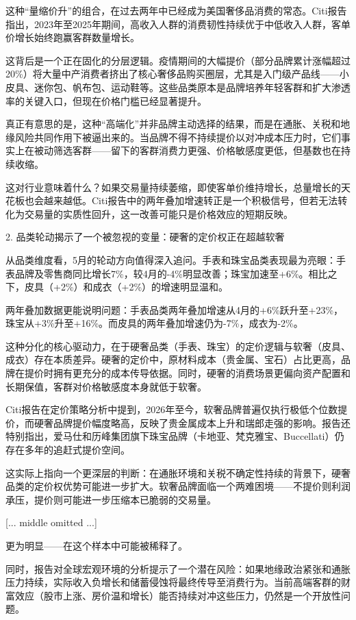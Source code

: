\documentclass[11pt]{ctexart}
\begin{document}
这种“量缩价升”的组合，在过去两年中已经成为美国奢侈品消费的常态。Citi报告指出，2023年至2025年期间，高收入人群的消费韧性持续优于中低收入人群，客单价增长始终跑赢客群数量增长。

这背后是一个正在固化的分层逻辑。疫情期间的大幅提价（部分品牌累计涨幅超过20\%）将大量中产消费者挤出了核心奢侈品购买圈层，尤其是入门级产品线——小皮具、迷你包、帆布包、运动鞋等。这些品类原本是品牌培养年轻客群和扩大渗透率的关键入口，但现在价格门槛已经显著提升。

真正有意思的是，这种“高端化”并非品牌主动选择的结果，而是在通胀、关税和地缘风险共同作用下被逼出来的。当品牌不得不持续提价以对冲成本压力时，它们事实上在被动筛选客群——留下的客群消费力更强、价格敏感度更低，但基数也在持续收缩。

这对行业意味着什么？如果交易量持续萎缩，即使客单价维持增长，总量增长的天花板也会越来越低。Citi报告中的两年叠加增速转正是一个积极信号，但若无法转化为交易量的实质性回升，这一改善可能只是价格效应的短期反映。

2. 品类轮动揭示了一个被忽视的变量：硬奢的定价权正在超越软奢

从品类维度看，5月的轮动方向值得深入追问。手表和珠宝品类表现最为亮眼：手表品牌及零售商同比增长7\%，较4月的-4\%明显改善；珠宝加速至+6\%。相比之下，皮具（+2\%）和成衣（+2\%）的增速明显温和。

两年叠加数据更能说明问题：手表品类两年叠加增速从4月的+6\%跃升至+23\%，珠宝从+3\%升至+16\%。而皮具的两年叠加增速仍为-7\%，成衣为-2\%。

这种分化的核心驱动力，在于硬奢品类（手表、珠宝）的定价逻辑与软奢（皮具、成衣）存在本质差异。硬奢的定价中，原材料成本（贵金属、宝石）占比更高，品牌在提价时拥有更充分的成本传导依据。同时，硬奢的消费场景更偏向资产配置和长期保值，客群对价格敏感度本身就低于软奢。

Citi报告在定价策略分析中提到，2026年至今，软奢品牌普遍仅执行极低个位数提价，而硬奢品牌提价幅度略高，反映了贵金属成本上升和瑞郎走强的影响。报告还特别指出，爱马仕和历峰集团旗下珠宝品牌（卡地亚、梵克雅宝、Buccellati）仍存在多年的追赶式提价空间。

这实际上指向一个更深层的判断：在通胀环境和关税不确定性持续的背景下，硬奢品类的定价权优势可能进一步扩大。软奢品牌面临一个两难困境——不提价则利润承压，提价则可能进一步压缩本已脆弱的交易量。

[... middle omitted ...]

更为明显——在这个样本中可能被稀释了。

同时，报告对全球宏观环境的分析提示了一个潜在风险：如果地缘政治紧张和通胀压力持续，实际收入负增长和储蓄侵蚀将最终传导至消费行为。当前高端客群的财富效应（股市上涨、房价温和增长）能否持续对冲这些压力，仍然是一个开放性问题。
\end{document}
